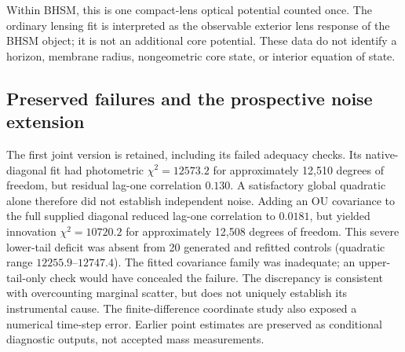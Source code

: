 Within BHSM, this is one compact-lens optical potential counted once. The ordinary
lensing fit is interpreted as the observable exterior lens response of the BHSM
object; it is not an additional core potential. These data do not identify a
horizon, membrane radius, nongeometric core state, or interior equation of state.

\subsection{Preserved failures and the prospective noise extension}

The first joint version is retained, including its failed adequacy checks.
Its native-diagonal fit had photometric $\chi^2=12573.2$ for approximately 12,510
degrees of freedom, but residual lag-one correlation $0.130$. A satisfactory
global quadratic alone therefore did not establish independent noise. Adding
an OU covariance to the full supplied diagonal reduced lag-one correlation to
$0.0181$, but yielded innovation $\chi^2=10720.2$ for approximately 12,508 degrees
of freedom. This severe lower-tail deficit was absent from 20 generated and
refitted controls (quadratic range $12255.9$--$12747.4$). The fitted covariance
family was inadequate; an upper-tail-only check would have concealed the failure.
The discrepancy is consistent with overcounting marginal scatter, but does not
uniquely establish its instrumental cause. The finite-difference coordinate
study also exposed a numerical time-step error. Earlier point estimates are
preserved as conditional diagnostic outputs, not accepted mass measurements.

